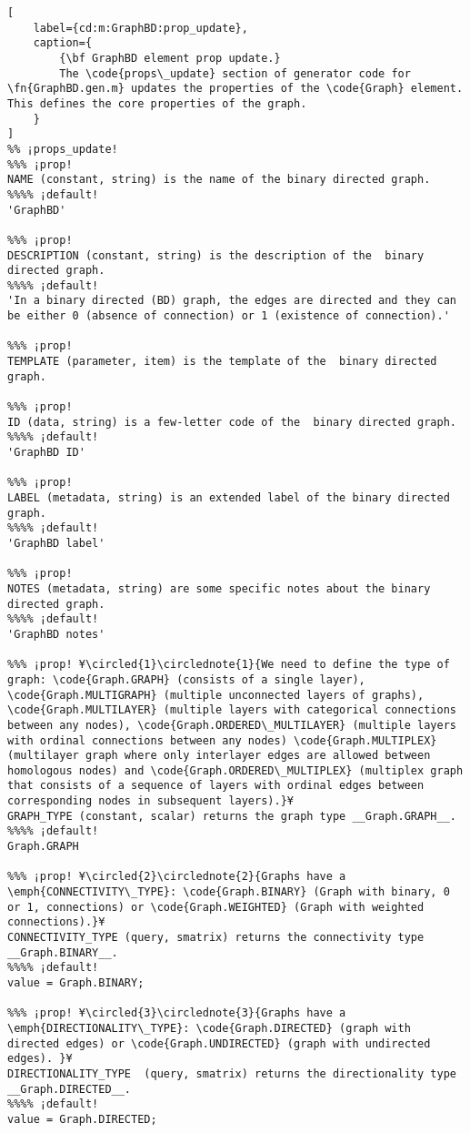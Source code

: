 \documentclass{tufte-handout}
\begin{document}
\begin{lstlisting}[
	label={cd:m:GraphBD:prop_update},
	caption={
		{\bf GraphBD element prop update.}
		The \code{props\_update} section of generator code for \fn{GraphBD.gen.m} updates the properties of the \code{Graph} element. This defines the core properties of the graph.
	}
]
%% ¡props_update!
%%% ¡prop!
NAME (constant, string) is the name of the binary directed graph.
%%%% ¡default!
'GraphBD'

%%% ¡prop!
DESCRIPTION (constant, string) is the description of the  binary directed graph.
%%%% ¡default!
'In a binary directed (BD) graph, the edges are directed and they can be either 0 (absence of connection) or 1 (existence of connection).'

%%% ¡prop!
TEMPLATE (parameter, item) is the template of the  binary directed graph.

%%% ¡prop!
ID (data, string) is a few-letter code of the  binary directed graph.
%%%% ¡default!
'GraphBD ID'

%%% ¡prop!
LABEL (metadata, string) is an extended label of the binary directed graph.
%%%% ¡default!
'GraphBD label'

%%% ¡prop!
NOTES (metadata, string) are some specific notes about the binary directed graph.
%%%% ¡default!
'GraphBD notes'

%%% ¡prop! ¥\circled{1}\circlednote{1}{We need to define the type of graph: \code{Graph.GRAPH} (consists of a single layer), \code{Graph.MULTIGRAPH} (multiple unconnected layers of graphs), \code{Graph.MULTILAYER} (multiple layers with categorical connections between any nodes), \code{Graph.ORDERED\_MULTILAYER} (multiple layers with ordinal connections between any nodes) \code{Graph.MULTIPLEX} (multilayer graph where only interlayer edges are allowed between homologous nodes) and \code{Graph.ORDERED\_MULTIPLEX} (multiplex graph that consists of a sequence of layers with ordinal edges between corresponding nodes in subsequent layers).}¥
GRAPH_TYPE (constant, scalar) returns the graph type __Graph.GRAPH__.
%%%% ¡default!
Graph.GRAPH

%%% ¡prop! ¥\circled{2}\circlednote{2}{Graphs have a \emph{CONNECTIVITY\_TYPE}: \code{Graph.BINARY} (Graph with binary, 0 or 1, connections) or \code{Graph.WEIGHTED} (Graph with weighted connections).}¥
CONNECTIVITY_TYPE (query, smatrix) returns the connectivity type __Graph.BINARY__.
%%%% ¡default!
value = Graph.BINARY;

%%% ¡prop! ¥\circled{3}\circlednote{3}{Graphs have a \emph{DIRECTIONALITY\_TYPE}: \code{Graph.DIRECTED} (graph with directed edges) or \code{Graph.UNDIRECTED} (graph with undirected edges). }¥
DIRECTIONALITY_TYPE  (query, smatrix) returns the directionality type __Graph.DIRECTED__.
%%%% ¡default!
value = Graph.DIRECTED;


\end{lstlisting}
\end{document}
